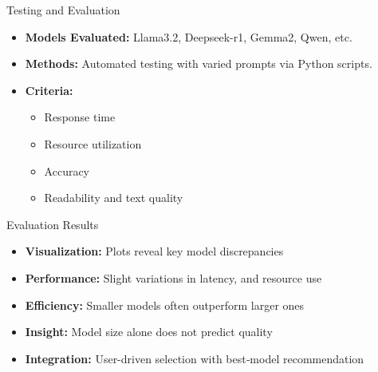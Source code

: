 \documentclass{beamer}
\begin{document}
\begin{frame}{Testing and Evaluation}
  \begin{itemize}
    \item \textbf{Models Evaluated:} Llama3.2, Deepseek-r1, Gemma2, Qwen, etc.
    \item \textbf{Methods:} Automated testing with varied prompts via Python scripts.
    \item \textbf{Criteria:}
      \begin{itemize}
        \item Response time
        \item Resource utilization
        \item Accuracy
        \item Readability and text quality
      \end{itemize}
  \end{itemize}
\end{frame}

\begin{frame}{Evaluation Results}
  \begin{itemize}
    \item \textbf{Visualization:} Plots reveal key model discrepancies
    \item \textbf{Performance:} Slight variations in latency, and resource use
    \item \textbf{Efficiency:} Smaller models often outperform larger ones
    \item \textbf{Insight:} Model size alone does not predict quality
    \item \textbf{Integration:} User-driven selection with best‑model recommendation
  \end{itemize}
\end{frame}
\end{document}
